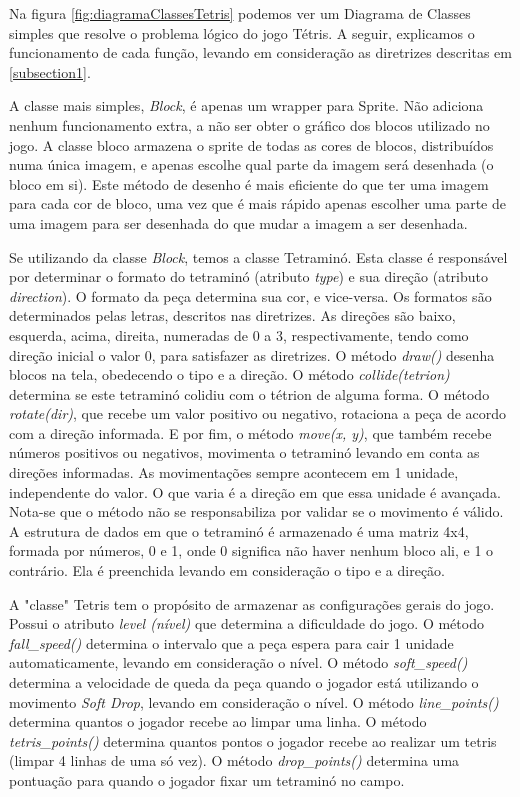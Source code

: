 \documentclass[
	12pt,				%
	openright,			%
	oneside,			%
	a4paper,			%
	brazil,				%
	]{abntex2}
\begin{document}
Na figura \ref{fig:diagramaClassesTetris} podemos ver um Diagrama de Classes simples que resolve o problema lógico do jogo Tétris. A seguir, explicamos o funcionamento de cada função, levando em consideração as diretrizes descritas em \ref{subsection1}.

A classe mais simples, \textit{Block}, é apenas um wrapper para Sprite. Não adiciona nenhum funcionamento extra, a não ser obter o gráfico dos blocos utilizado no jogo. A classe bloco armazena o sprite de todas as cores de blocos, distribuídos numa única imagem, e apenas escolhe qual parte da imagem será desenhada (o bloco em si). Este método de desenho é mais eficiente do que ter uma imagem para cada cor de bloco, uma vez que é mais rápido apenas escolher uma parte de uma imagem para ser desenhada do que mudar a imagem a ser desenhada.

Se utilizando da classe \textit{Block}, temos a classe Tetraminó. Esta classe é responsável por determinar o formato do tetraminó (atributo \textit{type}) e sua direção (atributo \textit{direction}). O formato da peça determina sua cor, e vice-versa. Os formatos são determinados pelas letras, descritos nas diretrizes. As direções são baixo, esquerda, acima, direita, numeradas de 0 a 3, respectivamente, tendo como direção inicial o valor 0, para satisfazer as diretrizes. O método \textit{draw()} desenha blocos na tela, obedecendo o tipo e a direção. O método \textit{collide(tetrion)} determina se este tetraminó colidiu com o tétrion de alguma forma. O método \textit{rotate(dir)}, que recebe um valor positivo ou negativo, rotaciona a peça de acordo com a direção informada. E por fim, o método \textit{move(x, y)}, que também recebe números positivos ou negativos, movimenta o tetraminó levando em conta as direções informadas. As movimentações sempre acontecem em 1 unidade, independente do valor. O que varia é a direção em que essa unidade é avançada. Nota-se que o método não se responsabiliza por validar se o movimento é válido. A estrutura de dados em que o tetraminó é armazenado é uma matriz 4x4, formada por números, 0 e 1, onde 0 significa não haver nenhum bloco ali, e 1 o contrário. Ela é preenchida levando em consideração o tipo e a direção.

A "classe" Tetris tem o propósito de armazenar as configurações gerais do jogo. Possui o atributo \textit{level (nível)} que determina a dificuldade do jogo. O método \textit{fall\_speed()} determina o intervalo que a peça espera para cair 1 unidade automaticamente, levando em consideração o nível. O método \textit{soft\_speed()} determina a velocidade de queda da peça quando o jogador está utilizando o movimento \textit{Soft Drop}, levando em consideração o nível. O método \textit{line\_points()} determina quantos o jogador recebe ao limpar uma linha. O método \textit{tetris\_points()} determina quantos pontos o jogador recebe ao realizar um tetris (limpar 4 linhas de uma só vez). O método \textit{drop\_points()} determina uma pontuação para quando o jogador fixar um tetraminó no campo.
\end{document}
